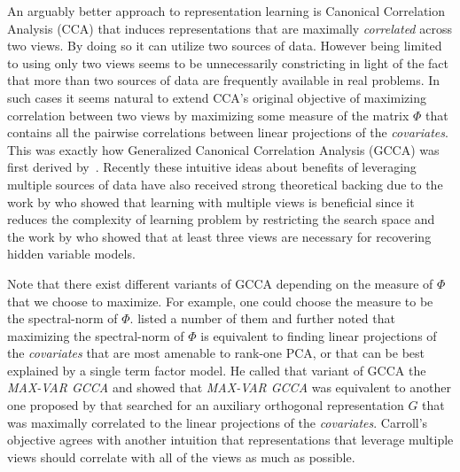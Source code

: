 \documentclass[11pt]{article}
\newcommand{\remove}[1]{}
\begin{document}
An arguably better approach to representation
learning is Canonical Correlation
Analysis (CCA) that induces representations that are maximally
\emph{correlated} across two views. By doing so it can utilize two
sources of data. However being limited to using only two views seems
to be unnecessarily constricting in light of the fact that
more than two sources of data are frequently available in real
problems. In such cases it seems natural to extend CCA's original objective of maximizing
correlation between two views by maximizing some measure
of the matrix $\Phi$ that contains all the pairwise correlations between
linear projections of the \emph{covariates}. This was
exactly how Generalized Canonical Correlation Analysis (GCCA) was
first derived by~. Recently
these intuitive ideas about benefits of leveraging multiple sources of
data have also received strong theoretical backing
due to the work by  who showed that learning
with multiple views is beneficial since it reduces the complexity of
learning problem by restricting the search space and the work by
 who showed that at least three views
are necessary for recovering hidden variable models.

Note that there exist different variants of GCCA depending on the
measure of $\Phi$ that we choose to maximize. For example, one could choose the measure to be
the spectral-norm of $\Phi$. \cite{kettenring1971canonical} listed a
number of them and further noted that
maximizing the spectral-norm of $\Phi$ is equivalent to 
finding linear projections of the \emph{covariates} that are most
amenable to rank-one PCA, or that can be best explained by a single
term factor model. He called that variant of GCCA the 
\emph{MAX-VAR GCCA} and showed that \emph{MAX-VAR GCCA} was equivalent to another one proposed by
\cite{carroll1968generalization} that searched for an auxiliary orthogonal  
representation $G$ that was maximally correlated to the linear
projections of the \emph{covariates}.  Carroll's objective agrees with another
 intuition that representations 
that leverage multiple views should correlate with all of the views as much
as possible.

\remove{ NOT TRUE, NOT TRUE
Another benefit of using GCCA over vanilla LSA is that since we can
naturally fuse the statistics generated by using different window sizes we
don't have to specify an arbitrary weighting method, like reciprocal
weighting, for creating a single cooccurrence matrix to represent a
corpus. 
}
\end{document}
